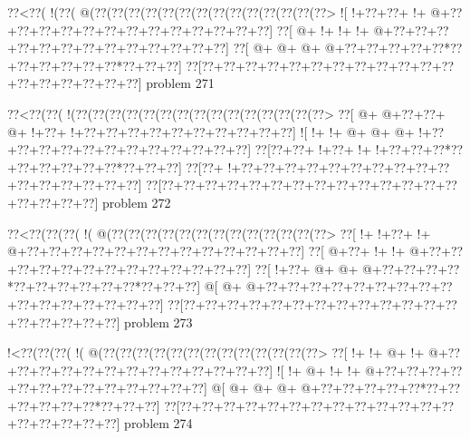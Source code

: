 \vbox{\vbox{\goo
\0??<\0??(\- !(\0??(\- @(\0??(\0??(\0??(\0??(\0??(\0??(\0??(\0??(\0??(\0??(\0??(\0??(\0??(\0??>
\- ![\- !+\0??+\0??+\- !+\- @+\0??+\0??+\0??+\0??+\0??+\0??+\0??+\0??+\0??+\0??+\0??+\0??+\0??]
\0??[\- @+\- !+\- !+\- !+\- @+\0??+\0??+\0??+\0??+\0??+\0??+\0??+\0??+\0??+\0??+\0??+\0??+\0??]
\0??[\- @+\- @+\- @+\- @+\0??+\0??+\0??+\0??+\0??*\0??+\0??+\0??+\0??+\0??+\0??*\0??+\0??+\0??]
\0??[\0??+\0??+\0??+\0??+\0??+\0??+\0??+\0??+\0??+\0??+\0??+\0??+\0??+\0??+\0??+\0??+\0??+\0??]
}
\hfil problem 271\hfil\break
}



\vbox{\vbox{\goo
\0??<\0??(\0??(\- !(\0??(\0??(\0??(\0??(\0??(\0??(\0??(\0??(\0??(\0??(\0??(\0??(\0??(\0??(\0??>
\0??[\- @+\- @+\0??+\0??+\- @+\- !+\0??+\- !+\0??+\0??+\0??+\0??+\0??+\0??+\0??+\0??+\0??+\0??]
\- ![\- !+\- !+\- @+\- @+\- @+\- !+\0??+\0??+\0??+\0??+\0??+\0??+\0??+\0??+\0??+\0??+\0??+\0??]
\0??[\0??+\0??+\- !+\0??+\- !+\- !+\0??+\0??+\0??*\0??+\0??+\0??+\0??+\0??+\0??*\0??+\0??+\0??]
\0??[\0??+\- !+\0??+\0??+\0??+\0??+\0??+\0??+\0??+\0??+\0??+\0??+\0??+\0??+\0??+\0??+\0??+\0??]
\0??[\0??+\0??+\0??+\0??+\0??+\0??+\0??+\0??+\0??+\0??+\0??+\0??+\0??+\0??+\0??+\0??+\0??+\0??]
}
\hfil problem 272\hfil\break
}



\vbox{\vbox{\goo
\0??<\0??(\0??(\0??(\- !(\- @(\0??(\0??(\0??(\0??(\0??(\0??(\0??(\0??(\0??(\0??(\0??(\0??(\0??>
\0??[\- !+\- !+\0??+\- !+\- @+\0??+\0??+\0??+\0??+\0??+\0??+\0??+\0??+\0??+\0??+\0??+\0??+\0??]
\0??[\- @+\0??+\- !+\- !+\- @+\0??+\0??+\0??+\0??+\0??+\0??+\0??+\0??+\0??+\0??+\0??+\0??+\0??]
\0??[\- !+\0??+\- @+\- @+\- @+\0??+\0??+\0??+\0??*\0??+\0??+\0??+\0??+\0??+\0??*\0??+\0??+\0??]
\- @[\- @+\- @+\0??+\0??+\0??+\0??+\0??+\0??+\0??+\0??+\0??+\0??+\0??+\0??+\0??+\0??+\0??+\0??]
\0??[\0??+\0??+\0??+\0??+\0??+\0??+\0??+\0??+\0??+\0??+\0??+\0??+\0??+\0??+\0??+\0??+\0??+\0??]
}
\hfil problem 273\hfil\break
}



\vbox{\vbox{\goo
\- !<\0??(\0??(\0??(\- !(\- @(\0??(\0??(\0??(\0??(\0??(\0??(\0??(\0??(\0??(\0??(\0??(\0??(\0??>
\0??[\- !+\- !+\- @+\- !+\- @+\0??+\0??+\0??+\0??+\0??+\0??+\0??+\0??+\0??+\0??+\0??+\0??+\0??]
\- ![\- !+\- @+\- !+\- !+\- @+\0??+\0??+\0??+\0??+\0??+\0??+\0??+\0??+\0??+\0??+\0??+\0??+\0??]
\- @[\- @+\- @+\- @+\- @+\0??+\0??+\0??+\0??+\0??*\0??+\0??+\0??+\0??+\0??+\0??*\0??+\0??+\0??]
\0??[\0??+\0??+\0??+\0??+\0??+\0??+\0??+\0??+\0??+\0??+\0??+\0??+\0??+\0??+\0??+\0??+\0??+\0??]
}
\hfil problem 274\hfil\break
}



